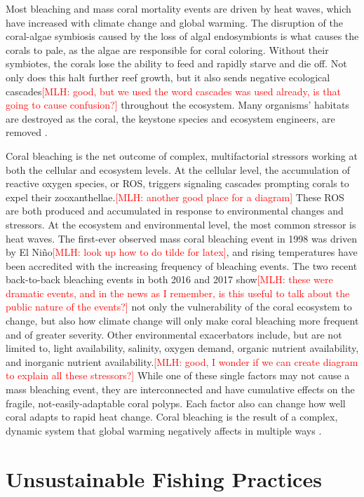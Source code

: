 \documentclass{book}\usepackage{knitr}
\newcommand{\red}[1]{\textcolor{red}{[MLH: #1]}}
\begin{document}
\begin{knitrout}
\begin{kframe}
{Most bleaching and mass coral mortality events are driven by heat waves, which have increased with climate change and global warming. The disruption of the coral-algae symbiosis caused by the loss of algal endosymbionts is what causes the corals to pale, as the algae are responsible for coral coloring. Without their symbiotes, the corals lose the ability to feed and rapidly starve and die off. Not only does this halt further reef growth, but it also sends negative ecological cascades\red{good, but we used the word cascades was used already, is that going to cause confusion?} throughout the ecosystem. Many organisms' habitats are destroyed as the coral, the keystone species and ecosystem engineers, are removed \citep{https://doi.org/10.1111/gcb.14871}.

Coral bleaching is the net outcome of complex, multifactorial stressors working at both the cellular and ecosystem levels. At the cellular level, the accumulation of reactive oxygen species, or ROS, triggers signaling cascades prompting corals to expel their zooxanthellae.\red{another good place for a diagram} These ROS are both produced and accumulated in response to environmental changes and stressors. At the ecosystem and environmental level, the most common stressor is heat waves. The first-ever observed mass coral bleaching event in 1998 was driven by El Niño\red{look up how to do tilde for latex}, and rising temperatures have been accredited with the increasing frequency of bleaching events. The two recent back-to-back bleaching events in both 2016 and 2017 show\red{these were dramatic events,  and in the news as I remember, is this useful to talk about the public nature of the events?} not only the vulnerability of the coral ecosystem to change, but also how climate change will only make coral bleaching more frequent and of greater severity. Other environmental exacerbators include, but are not limited to, light availability, salinity, oxygen demand, organic nutrient availability, and inorganic nutrient availability.\red{good, I wonder if we can create diagram to explain all these stressors?} While one of these single factors may not cause a mass bleaching event, they are interconnected and have cumulative effects on the fragile, not-easily-adaptable coral polyps. Each factor also can change how well coral adapts to rapid heat change. Coral bleaching is the result of a complex, dynamic system that global warming negatively affects in multiple ways \citep{https://doi.org/10.1111/gcb.14871}.

\section{Unsustainable Fishing Practices}

}
\end{kframe}
\end{knitrout}
\end{document}
